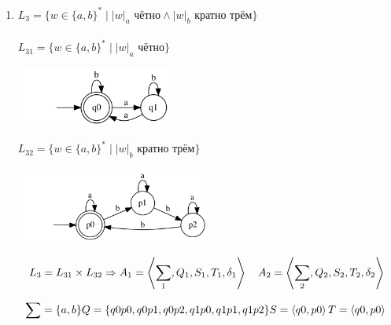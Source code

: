 \documentclass{article}
\begin{document}
\begin{enumerate}
\item {$L_3 = \{w \in \{a,b\}^*   \mid   |w|_a \text{ чётно} \wedge |w|_b \text{ кратно трём} \} $} \\ \\
    $L_{31} = \{w \in \{a,b\}^*   \mid   |w|_a \text{ чётно} \} $\\
    \begin{center}
        \includegraphics[width=0.4\textwidth]{g231.png}
    \end{center}
    $L_{32} = \{w \in \{a,b\}^*   \mid   |w|_b \text{ кратно трём} \} $\\
    \begin{center}
        \includegraphics[width=0.5\textwidth]{g232.png}
    \end{center}
    
    \begin{center}
    \[
        L_3 = L_{31} \times L_{32} \Rightarrow \\
        A_1 = \left\langle \sum_{1} , Q_1, S_1, T_1, \delta_1\right\rangle \quad 
        A_2 = \left\langle \sum_{2}, Q_2, S_2, T_2, \delta_2\right\rangle
    \]
    
    \[
        \sum = \{a, b\} \\
        Q = \{q0p0, q0p1, q0p2, q1p0, q1p1, q1p2\} \\
        S = \left\langle q0,p0 \right\rangle \\
        T = \left\langle q0,p0 \right\rangle \\
    \]
    

\end{center}
\end{enumerate}
\end{document}
